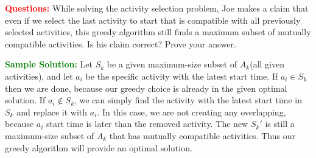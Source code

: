 \problem

\textcolor{Red}{\textbf{Questions:}}
While solving the activity selection problem, Joe makes a claim that even if we select the last activity to start that is compatible with all previously selected activities, this greedy algorithm still finds a maximum subset of mutually compatible activities. Is his claim correct? Prove your answer.

\textcolor{Green}{\textbf{Sample Solution:}}
Let $S_k$ be a given maximum-size subset of $A_k$(all given activities), and let $a_i$ be the specific activity with the latest start time. If $a_i \in S_k$ then we are done, because our greedy choice is already in the given optimal solution. If $a_i \not\in S_k$, we can simply find the activity with the latest start time in $S_k$ and replace it with $a_i$. In this case, we are not creating any overlapping, because $a_i$ start time is later than the removed activity. The new $S_k'$ is still a maximum-size subset of $A_k$ that has mutually compatible activities. Thus our greedy algorithm will provide an optimal solution.